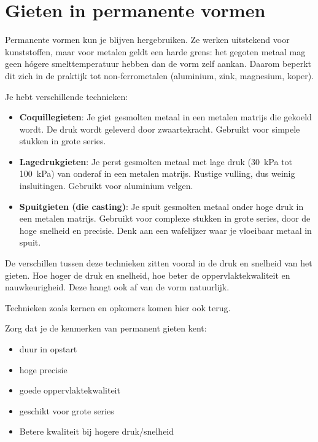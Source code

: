 \documentclass[a4paper,11pt,twoside]{report}
\begin{document}
\section{Gieten in permanente vormen}
Permanente vormen kun je blijven hergebruiken.
Ze werken uitstekend voor kunststoffen, maar voor metalen geldt een harde grens: het gegoten metaal
mag geen hógere smelttemperatuur hebben dan de vorm zelf aankan. Daarom beperkt dit zich in de praktijk
tot non-ferrometalen (aluminium, zink, magnesium, koper).

Je hebt verschillende technieken:
\begin{itemize}
    \item \textbf{Coquillegieten}: Je giet gesmolten metaal in een metalen matrijs die gekoeld wordt. De druk wordt geleverd door
          zwaartekracht.
          Gebruikt voor simpele stukken in grote series.
    \item \textbf{Lagedrukgieten}: Je perst gesmolten metaal met lage druk (\SI{30}{kPa} tot \SI{100}{kPa})
          van onderaf in een metalen matrijs. Rustige vulling, dus weinig insluitingen.
          Gebruikt voor aluminium velgen.
    \item \textbf{Spuitgieten (die casting)}: Je spuit gesmolten metaal onder hoge druk in een metalen matrijs.
          Gebruikt voor complexe stukken in grote series, door de hoge snelheid en precisie.
          Denk aan een wafelijzer waar je vloeibaar metaal in spuit.
\end{itemize}

De verschillen tussen deze technieken zitten vooral in de druk en snelheid van het gieten.
Hoe hoger de druk en snelheid, hoe beter de oppervlaktekwaliteit en nauwkeurigheid.
Deze hangt ook af van de vorm natuurlijk.

Technieken zoals kernen en opkomers komen hier ook terug.
\begin{examenbox}
    Zorg dat je de kenmerken van permanent gieten kent:
    \begin{itemize}
        \item duur in opstart
        \item hoge precisie
        \item goede oppervlaktekwaliteit
        \item geschikt voor grote series
        \item Betere kwaliteit bij hogere druk/snelheid
    \end{itemize}
\end{examenbox}
\end{document}
